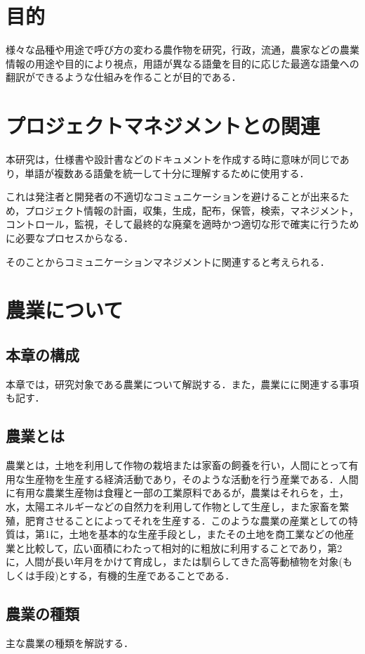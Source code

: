 \chapter{目的}
様々な品種や用途で呼び方の変わる農作物を研究，行政，流通，農家などの農業情報の用途や目的により視点，用語が異なる語彙を目的に応じた最適な語彙への翻訳ができるような仕組みを作ることが目的である．

\chapter{プロジェクトマネジメントとの関連}
本研究は，仕様書や設計書などのドキュメントを作成する時に意味が同じであり，単語が複数ある語彙を統一して十分に理解するために使用する．

これは発注者と開発者の不適切なコミュニケーションを避けることが出来るため，プロジェクト情報の計画，収集，生成，配布，保管，検索，マネジメント，コントロール，監視，そして最終的な廃棄を適時かつ適切な形で確実に行うために必要なプロセスからなる．

そのことからコミュニケーションマネジメントに関連すると考えられる．

\chapter{農業について}
\section{本章の構成}
本章では，研究対象である農業について解説する．また，農業にに関連する事項も記す．
\section{農業とは}
農業とは，土地を利用して作物の栽培または家畜の飼養を行い，人間にとって有用な生産物を生産する経済活動であり，そのような活動を行う産業である．人間に有用な農業生産物は食糧と一部の工業原料であるが，農業はそれらを，土，水，太陽エネルギーなどの自然力を利用して作物として生産し，また家畜を繁殖，肥育させることによってそれを生産する．このような農業の産業としての特質は，第1に，土地を基本的な生産手段とし，またその土地を商工業などの他産業と比較して，広い面積にわたって相対的に粗放に利用することであり，第2に，人間が長い年月をかけて育成し，または馴らしてきた高等動植物を対象(もしくは手段)とする，有機的生産であることである．\cite{nouwiki2015}
\section{農業の種類}
主な農業の種類を解説する．\cite{kotoba}

